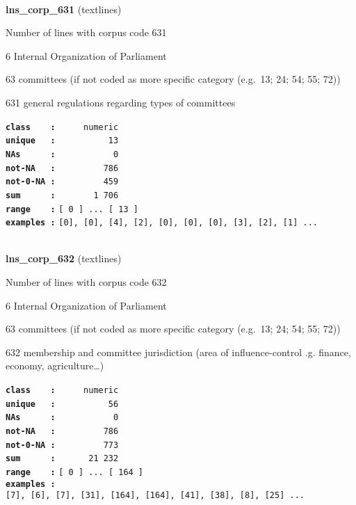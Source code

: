 \documentclass[]{article}
\begin{document}
~

\textbf{lns\_corp\_631} (textlines)

Number of lines with corpus code 631

6 Internal Organization of Parliament

63 committees (if not coded as more specific category (e.g.~13; 24; 54;
55; 72))

631 general regulations regarding types of committees

\textbf{\texttt{class\ \ \ \ :}} \texttt{~~~~~numeric}\\
\textbf{\texttt{unique\ \ \ :}} \texttt{~~~~~~~~~~13}\\
\textbf{\texttt{NAs\ \ \ \ \ \ :}} \texttt{~~~~~~~~~~~0}\\
\textbf{\texttt{not-NA\ \ \ :}} \texttt{~~~~~~~~~786}\\
\textbf{\texttt{not-0-NA\ :}} \texttt{~~~~~~~~~459}\\
\textbf{\texttt{sum\ \ \ \ \ \ :}} \texttt{~~~~~~~1~706}\\
\textbf{\texttt{range\ \ \ \ :}}
\texttt{{[}\ 0\ {]}\ ...\ {[}\ 13\ {]}}\\
\textbf{\texttt{examples\ :}}
\texttt{{[}0{]},\ {[}0{]},\ {[}4{]},\ {[}2{]},\ {[}0{]},\ {[}0{]},\ {[}0{]},\ {[}3{]},\ {[}2{]},\ {[}1{]}\ ...}\\

~

\textbf{lns\_corp\_632} (textlines)

Number of lines with corpus code 632

6 Internal Organization of Parliament

63 committees (if not coded as more specific category (e.g.~13; 24; 54;
55; 72))

632 membership and committee jurisdiction (area of influence-control .g.
finance, economy, agriculture\ldots{})

\textbf{\texttt{class\ \ \ \ :}} \texttt{~~~~~numeric}\\
\textbf{\texttt{unique\ \ \ :}} \texttt{~~~~~~~~~~56}\\
\textbf{\texttt{NAs\ \ \ \ \ \ :}} \texttt{~~~~~~~~~~~0}\\
\textbf{\texttt{not-NA\ \ \ :}} \texttt{~~~~~~~~~786}\\
\textbf{\texttt{not-0-NA\ :}} \texttt{~~~~~~~~~773}\\
\textbf{\texttt{sum\ \ \ \ \ \ :}} \texttt{~~~~~~21~232}\\
\textbf{\texttt{range\ \ \ \ :}}
\texttt{{[}\ 0\ {]}\ ...\ {[}\ 164\ {]}}\\
\textbf{\texttt{examples\ :}}
\texttt{{[}7{]},\ {[}6{]},\ {[}7{]},\ {[}31{]},\ {[}164{]},\ {[}164{]},\ {[}41{]},\ {[}38{]},\ {[}8{]},\ {[}25{]}\ ...}\\
\end{document}
